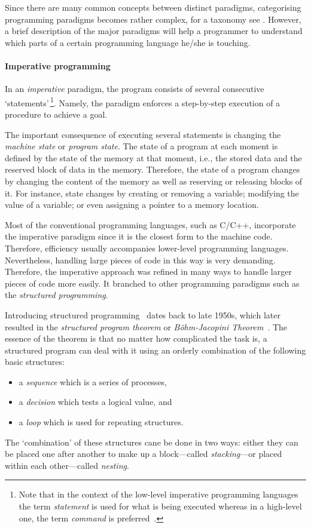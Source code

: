 	Since there are many common concepts between distinct paradigms, categorising programming paradigms becomes rather complex, for a taxonomy see \autocite{vanRoy.2009}. However, a brief description of the major paradigms will help a programmer to understand which parts of a certain programming language he/she is touching. 

	\paragraph{Imperative programming} In an \textit{imperative} paradigm, the program consists of several consecutive `statements'\,\footnote{Note that in the context of the low-level imperative programming languages the term \textit{statement} is used for what is being executed whereas in a high-level one, the term \textit{command} is preferred~\autocite{Normark.2003}.}. Namely, the paradigm enforces a step-by-step execution of a procedure to achieve a goal. 
	
	The important consequence of executing several statements is changing the \textit{machine state} or \textit{program state}. The state of a program at each moment is defined by the state of the memory at that moment, i.e., the stored data and the reserved block of data in the memory. Therefore, the state of a program changes by changing the content of the memory as well as reserving or releasing blocks of it. For instance, state changes by creating or removing a variable; modifying the value of a variable; or even assigning a pointer to a memory location.

	Most of the conventional programming languages, such as C/C++, incorporate the imperative paradigm since it is the closest form to the machine code. Therefore, efficiency usually accompanies lower-level programming languages. Nevertheless, handling large pieces of code in this way is very demanding. Therefore, the imperative approach was refined in many ways to handle larger pieces of code more easily. It branched to other programming paradigms such as the \textit{structured programming}.
	
	Introducing structured programming~\autocite{Dahl.1972} dates back to late 1950s, which later resulted in the \textit{structured program theorem} or \textit{B\"ohm-Jacopini Theorem}~\autocite{Bohm.1966}. The essence of the theorem is that no matter how complicated the task is, a structured program can deal with it using an orderly combination of the following basic structures:
	\begin{itemize}
	\item a \textit{sequence} which is a series of processes,
	\item a \textit{decision} which tests a logical value, and
	\item a \textit{loop} which is used for repeating structures.
	\end{itemize}
	The `combination' of these structures cane be done in two ways: either they can be placed one after another to make up a block---called \textit{stacking}---or placed within each other---called \textit{nesting}.
	
